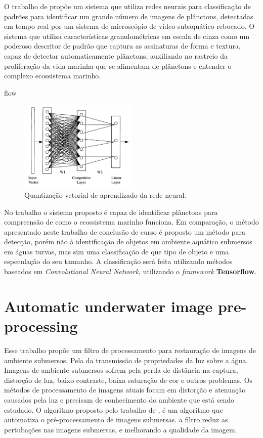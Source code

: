 O trabalho de  propõe um sistema que utiliza redes neurais para classificação de  padrões para identificar um grande número de imagens de plânctons, detectadas em tempo real por um sistema de microscópio de vídeo subaquático rebocado. O sistema que utiliza características granulométricas em escala de cinza como um poderoso descritor de padrão que captura as assinaturas de forma e textura, capaz de detectar automaticamente plânctons, auxiliando no rastreio da proliferação da vida marinha que se alimentam de plânctons e entender o complexo ecossistema marinho.

flow\begin{figure}[h]
	\caption{\label{fig:tangnet} Quantização vetorial de aprendizado da rede neural.}
	\begin{center}
	    \includegraphics[width=0.5\textwidth]{resources/neuralnet}
	\end{center}
\end{figure}

No trabalho  o sistema proposto é capaz de identificar plânctons para compreensão de como o ecossistema marinho funciona. Em comparação, o método apresentado neste trabalho de conclusão de curso é proposto um método para detecção, porém não à identificação de objetos em ambiente aquático submersos em águas turvas, mas sim uma classificação de que tipo de objeto e uma especulação do seu tamanho. A classificação será feita utilizando métodos baseados em \textit{Convolutional Neural Network}, utilizando o \textit{framework} \textbf{Tensorflow}.

\section{Automatic underwater image pre-processing}
Esse trabalho propõe um filtro de processamento para restauração de imagens de ambiente submersos. Pela da transmissão de propriedades da luz sobre a água. Imagens de ambiente submersos sofrem pela perda de distância na captura, distorção de luz, baixo contraste, baixa saturação de cor e outros problemas. Os métodos de processamento de imagens atuais focam em distorção e atenuação causados pela luz e precisam de conhecimento do ambiente que está sendo estudado. O algoritmo proposto pelo trabalho de \cite{bazeille2006}, é um algoritmo que automatiza o pré-processamento de imagens submersas.  a filtro reduz as pertubações nas imagens submersas, e melhorando a qualidade da imagem.



